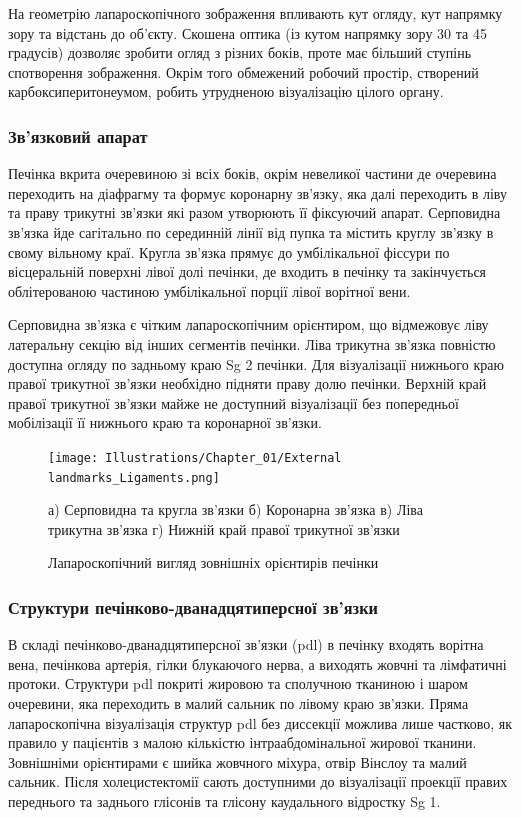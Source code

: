 \begin{refsection}
На геометрію лапароскопічного зображення впливають кут огляду, кут напрямку зору та відстань до об'єкту. Скошена оптика (із кутом напрямку зору 30 та 45 градусів) дозволяє зробити огляд з різних боків, проте має більший ступінь спотворення зображення. Окрім того обмежений робочий простір, створений карбоксиперитонеумом, робить утрудненою візуалізацію цілого органу.

\subsubsection{Зв'язковий апарат}

Печінка вкрита очеревиною зі всіх боків, окрім невеликої частини  де очеревина переходить на діафрагму та формує коронарну зв'язку, яка далі переходить в ліву та праву трикутні зв'язки які разом утворюють її фіксуючий апарат. Серповидна зв'язка йде сагітально по серединній лінії від пупка та містить круглу зв'язку в свому вільному краї. Кругла зв'язка прямує до умбілікальної фіссури по вісцеральній поверхні лівої долі печінки, де входить в печінку та закінчується облітерованою частиною умбілікальної порції лівої ворітної вени. 

Серповидна зв'язка є чітким лапароскопічним орієнтиром, що відмежовує ліву латеральну секцію від інших сегментів печінки. Ліва трикутна зв'язка повністю доступна огляду по задньому краю Sg 2 печінки. Для візуалізації нижнього краю правої трикутної зв'язки необхідно підняти праву долю печінки. Верхній край правої трикутної зв'язки майже не доступний візуалізації без попередньої мобілізації її нижнього краю та коронарної зв'язки. 

\begin{figure}[h]
\caption{Лапароскопічний вигляд зовнішніх орієнтирів печінки}

\texttt{[image: Illustrations/Chapter\_01/External landmarks\_Ligaments.png]}
\label{fig:External_landmarks_Ligaments}

\small
а) Серповидна та кругла зв'язки б) Коронарна зв'язка в) Ліва трикутна зв'язка г) Нижній край правої трикутної зв'язки
\end{figure}



\subsubsection{Структури печінково-дванадцятиперсної зв'язки}

В складі печінково-дванадцятиперсної зв'язки (\acrshort{pdl}) в печінку входять ворітна вена, печінкова артерія, гілки блукаючого нерва, а виходять жовчні та лімфатичні протоки. Структури \acrshort{pdl} покриті жировою та сполучною тканиною і шаром очеревини, яка переходить в малий сальник по лівому краю зв'язки. Пряма лапароскопічна візуалізація структур \acrshort{pdl} без диссекції можлива лише частково, як правило у пацієнтів з малою кількістю інтраабдомінальної жирової тканини. Зовнішніми орієнтирами є шийка жовчного міхура, отвір Вінслоу та малий сальник. Після холецистектомії сають доступними до візуалізації проекції правих переднього та заднього глісонів та глісону каудального відростку Sg 1. 


\end{refsection}
